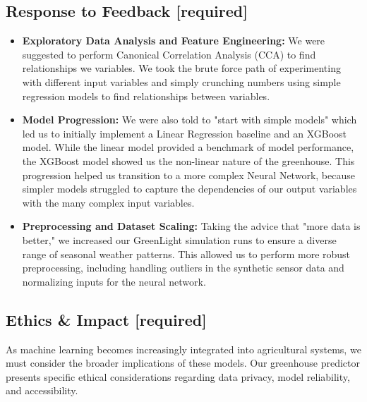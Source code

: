 \documentclass{article}
\begin{document}
\subsection{Response to Feedback [required]}

\begin{itemize}
    \item \textbf{Exploratory Data Analysis and Feature Engineering:} We were suggested to perform Canonical Correlation Analysis (CCA) to find relationships we variables. We took the brute force path of experimenting with different input variables and simply crunching numbers using simple regression models to find relationships between variables.
    
    \item \textbf{Model Progression:} We were also told to "start with simple models" which led us to initially implement a Linear Regression baseline and an XGBoost model. While the linear model provided a benchmark of model performance, the XGBoost model showed us the non-linear nature of the greenhouse. This progression helped us transition to a more complex Neural Network, because simpler models struggled to capture the dependencies of our output variables with the many complex input variables.
    
    \item \textbf{Preprocessing and Dataset Scaling:} Taking the advice that "more data is better," we increased our GreenLight simulation runs to ensure a diverse range of seasonal weather patterns. This allowed us to perform more robust preprocessing, including handling outliers in the synthetic sensor data and normalizing inputs for the neural network.
\end{itemize}

\subsection{Ethics \& Impact [required]}
As machine learning becomes increasingly integrated into agricultural systems, we must consider the broader implications of these models. Our greenhouse predictor presents specific ethical considerations regarding data privacy, model reliability, and accessibility.
\end{document}
